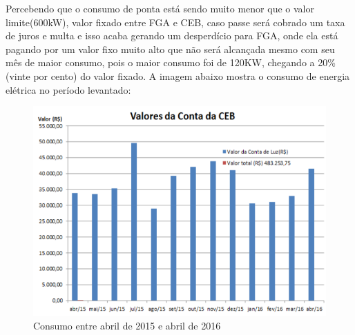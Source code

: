 \par Percebendo que o consumo de ponta está sendo muito menor que o valor limite(600kW), valor fixado entre FGA e CEB, caso passe será cobrado um taxa de juros e multa e isso acaba gerando um desperdício para FGA, onde ela está pagando por um valor fixo muito alto que não será alcançada mesmo com seu mês de maior consumo, pois o maior consumo foi de 120KW, chegando a 20\% (vinte por cento) do valor fixado. A imagem abaixo mostra o consumo de energia elétrica no período levantado:
\begin{figure}[!htb]
\centering
\includegraphics[width=0.65\paperwidth]{figuras/graficocontasCEB.png}
\caption{Consumo entre abril de 2015 e abril de 2016}
\end{figure}



